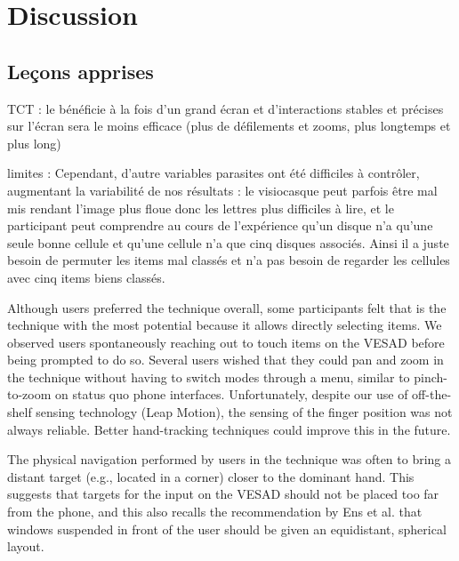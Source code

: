 \chapter{Discussion}
\label{ch:discussion}

\section{Leçons apprises}
\label{sec:discussion_lessons}

TCT : le  bénéficie à la fois d'un grand écran \citep{Liu2014} et d'interactions stables et précises sur l'écran \citep{Jones2012}
 sera le moins efficace (plus de défilements et zooms, plus longtemps et plus long)

limites : Cependant, d'autre variables parasites ont été difficiles à contrôler, augmentant la variabilité de nos résultats : le visiocasque peut parfois être mal mis rendant l'image plus floue donc les lettres plus difficiles à lire, et le participant peut comprendre au cours de l'expérience qu'un disque n'a qu'une seule bonne cellule et qu'une cellule n'a que cinq disques associés. Ainsi il a juste besoin de permuter les items mal classés et n'a pas besoin de regarder les cellules avec cinq items biens classés.

Although users preferred the  technique overall, some participants felt that  is the technique with the most potential because it allows directly selecting items. We observed users spontaneously reaching out to touch items on the VESAD before being prompted to do so. Several users wished that they could pan and zoom in the  technique without having to switch modes through a menu, similar to pinch-to-zoom on status quo phone interfaces. Unfortunately, despite our use of off-the-shelf sensing technology (Leap Motion), the sensing of the finger position was not always reliable. Better hand-tracking techniques \cite{Taylor2016} could improve this in the future.

The physical navigation performed by users in the  technique was often to bring a distant target (e.g., located in a corner) closer to the dominant hand. This suggests that targets for the input on the VESAD should not be placed too far from the phone, and this also recalls the recommendation by Ens et al. \cite{Ens2014} that windows suspended in front of the user should be given an equidistant, spherical layout.


